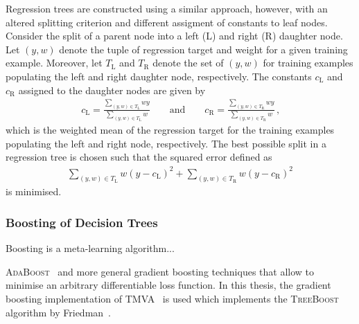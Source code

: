Regression trees are constructed using a similar approach, however, with an
altered splitting criterion and different assigment of constants to leaf
nodes. Consider the split of a parent node into a left (L) and right (R)
daughter node. Let $(y, w)$ denote the tuple of regression target and weight for
a given training example. Moreover, let $T_{\text{L}}$ and $T_{\text{R}}$ denote
the set of $(y, w)$ for training examples populating the left and right daughter
node, respectively. The constants $c_{\text{L}}$ and $c_{\text{R}}$ assigned to
the daughter nodes are given by
\begin{align*}
  c_{\text{L}} = \frac{\sum_{(y, w) \in T_{\text{L}}} w y}{\sum_{(y, w) \in T_{\text{L}}} w} \qquad \text{and} \qquad c_{\text{R}} = \frac{\sum_{(y, w) \in T_{\text{R}}} w y}{\sum_{(y, w) \in T_{\text{R}}} w} \,\text{,}
\end{align*}
which is the weighted mean of the regression target for the training examples
populating the left and right node, respectively. The best possible split in a
regression tree is chosen such that the squared error defined as
\begin{align*}
  \sum_{(y, w) \in T_{\text{L}}} w (y - c_{\text{L}})^2 + \sum_{(y, w) \in T_{\text{R}} } w (y - c_{\text{R}})^2
\end{align*}
is minimised.


\subsubsection{Boosting of Decision Trees}

Boosting is a meta-learning algorithm...


\textsc{AdaBoost}~\cite{freund_shapire:adaboost,freund_shapire:adaboost2} and
more general gradient boosting techniques that allow to minimise an arbitrary
differentiable loss function.  In this thesis, the gradient boosting
implementation of TMVA~\cite{TMVA} is used which implements the
\textsc{TreeBoost} algorithm by Friedman~\cite{Friedman:2001wbq}.







